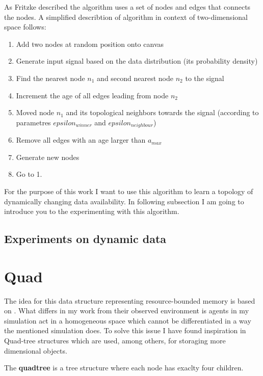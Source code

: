As Fritzke described the algorithm uses a set of nodes and edges that connects the nodes. A simplified describtion of algorithm in context of two-dimensional space follows:

\begin{enumerate}
\item Add two nodes at random position onto canvas
\item Generate input signal based on the data distribution (its probability density)
\item Find the nearest node $n_1$ and second nearest node $n_2$ to the signal
\item Increment the age of all edges leading from node $n_2$
\item Moved node $n_1$ and its topological neighbors towards the signal (according to parametres $epsilon_{winner}$ and $epsilon_{neighbour}$)
\item Remove all edges with an age larger than $a_{max}$
\item Generate new nodes
\item Go to 1.
\end{enumerate}

For the purpose of this work I want to use this algorithm to learn a topology of dynamically changing data availability. In following subsection I am going to introduce you to the experimenting with this algorithm.

\subsection{Experiments on dynamic data}

\section{Quad}

The idea for this data structure representing resource-bounded memory is based on \cite{Brom:placeandobjects}. What differs in my work from their observed environment is agents in my simulation act in a homogeneous space which cannot be differentiated in a way the mentioned simulation does. To solve this issue I have found inspiration in Quad-tree structures \cite{Finkel:quadtrees} which are used, among others, for storaging more dimensional objects.

\begin{definition}The {\bf quadtree} is a tree structure where each node has exaclty four children. 
\end{definition}
                  
